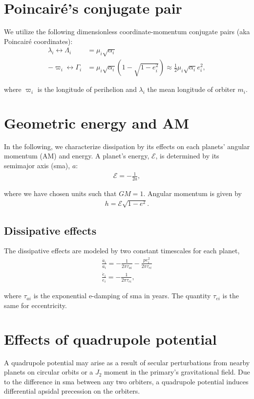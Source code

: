 \documentclass[11pt]{article}
\begin{document}
\clearpage
\onecolumn
\appendix

\section{Poincair\'e's conjugate pair}
\label{sec:org748b5c4}
We utilize the following dimensionless coordinate-momentum conjugate
pairs (aka Poincair\'e coordinates):
\begin{align}
  \lambda_i \longleftrightarrow\Lambda_i &= \mu_i\sqrt{\alpha_i} \\
  -\varpi_i \longleftrightarrow\Gamma_i &= \mu_i\sqrt{\alpha_i}(1-\sqrt{1-e_i^2}) \approx \frac12\mu_i\sqrt{\alpha_i}e_i^2,
\end{align}

\noindent
where \(\varpi_i\) is the longitude of perihelion and \(\lambda_i\) the mean longitude
of orbiter \(m_i\).

\section{Geometric energy and AM}
\label{sec:orge5528e8}
In the following, we characterize dissipation by its effects on each
planets' angular momentum (AM) and energy.  A planet's energy,
\(\mathcal E\), is determined by its semimajor axis (sma), \(a\):
\begin{align}
   \mathcal E = -\frac{1}{2a},
\end{align}
\noindent

\noindent
where we have chosen units such that \(GM=1\).
Angular momentum is given by
\begin{align}
h = \mathcal E \sqrt{1-e^2}.
\end{align}

\subsection{Dissipative effects}
\label{sec:org66b76d8}
The dissipative effects are modeled
by two constant timescales for each planet, 
\begin{align}
  \frac{\dot a_i}{a_i} = -\frac{1}{2\pi\tau_{ai}} - \frac{pe_i^2}{2\pi\tau_{ei}} \\
  \frac{\dot e_i}{e_i} = -\frac{1}{2\pi\tau_{ei}} ,
\end{align}

where \(\tau_{ai}\) is the exponential e-damping of sma in years.  The
quantity \(\tau_{ei}\) is the same for eccentricity.

\section{Effects of quadrupole potential}
\label{sec:org661975e}
A quadrupole potential may arise as a result of secular perturbations
from nearby planets on circular orbits or a \(J_2\) moment in the
primary's gravitational field. Due to the difference in sma
between any two orbiters, a quadrupole potential induces
differential apsidal precession on the orbiters.
\end{document}
